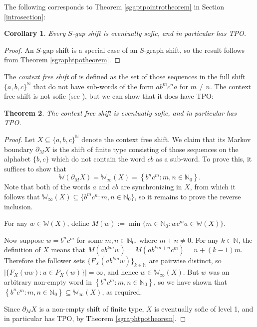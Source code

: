 \documentclass[reqno,11pt]{amsart}
\newtheorem{thm}{Theorem}[section]
\newtheorem{cor}[thm]{Corollary}
\theoremstyle{definition}
\theoremstyle{remark}
\theoremstyle{remark}
\def \N {\mathbb N}
\def\w{\mathbb{W}}
\numberwithin{equation}{section}
\begin{document}
The following corresponds to Theorem \ref{sgaptpointrotheorem} in Section \ref{introsection}:


\begin{cor}\label{s_gap_cor}
Every $S$-gap shift
is eventually sofic, 
and in particular has  
TPO.
\end{cor}
\begin{proof}
An $S$-gap shift is a special case of an $S$-graph shift, so the result follows from
Theorem \ref{sgraphtpotheorem}. 
\end{proof}



The \emph{context free shift} of \cite[\S 1.2]{LM95} is defined as the set of those sequences
in the full shift $\{a,b,c\}^\N$ that do not have sub-words of the form $ab^mc^na$ for $m\neq n$.
The context free shift is not sofic (see \cite[p.~68]{LM95}), but we can show that it does have TPO:

\begin{thm}\label{context_free_theorem}
The context free shift is eventually sofic, and in particular has TPO.
\end{thm}
\begin{proof}
Let $X \subseteq \{a,b,c\}^\N$ denote the context free shift.
We claim that its Markov boundary $\partial_M X$ is the shift of finite type consisting of those
sequences on the alphabet $\{b,c\}$ which do not contain the word $cb$ as a sub-word.
To prove this, it suffices to show that 
\begin{equation}\label{context_free_boundary}
\w(\partial_M X)=\w_\infty(X)= \left\{ b^n c^m : m,n\in\N_0\right\}.
\end{equation}
Note that both of the words $a$ and $cb$ are synchronizing in $X$, 
from which it follows that 
$\w_\infty(X) \subseteq \{ b^m c^n : m,n\in\N_0 \}$,
so it remains to prove the reverse inclusion.

For any $w\in\w(X)$, define
$M(w):=\min \{m\in\N_0: w c^m a\in \w(X)\}$.

Now suppose $w=b^n c^m$ for some $m,n\in\N_0$, where $m+n\neq 0$.
For any $k\in\N$, the definition of $X$ means that 
$M(a b^{km}w)
=M(a b^{km+n}c^m)
=n+(k-1)m$.
Therefore the follower sets $\{ F_X(ab^{km} w)\}_{k\in\N}$ are pairwise distinct,
so
$|\{F_X(uw):u\in P_X(w)\}|=\infty$,
and hence $w\in\w_\infty(X)$.
But $w$ was an arbitrary non-empty word in $\left\{ b^n c^m : m,n\in\N_0\right\}$, so we have shown that
$\left\{ b^n c^m : m,n\in\N_0\right\} \subseteq \w_\infty(X)$, as required.

Since $\partial_M X$ is a non-empty shift of finite type, $X$ is eventually sofic of level 1, and in particular has TPO, by Theorem \ref{sgraphtpotheorem}. 
\end{proof}
\end{document}
